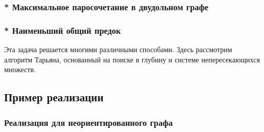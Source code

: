\documentclass[a4paper,12pt]{article}
\begin{document}
      \subsubsection{* Максимальное паросочетание в двудольном графе}

      \subsubsection{* Наименьший общий предок}

      Эта задача решается многими различными способами. Здесь рассмотрим
      алгоритм Тарьяна, основанный на поиске в глубину и системе
      непересекающихся множеств.

    \subsection{Пример реализации}

      \subsubsection{Реализация для неориентированного графа}

        
\end{document}
